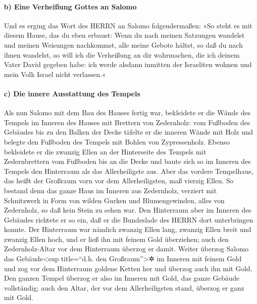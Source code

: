 \hypertarget{b-eine-verheiuxdfung-gottes-an-salomo}{%
\paragraph{b) Eine Verheißung Gottes an
Salomo}\label{b-eine-verheiuxdfung-gottes-an-salomo}}

Und es erging das Wort des HERRN an Salomo
folgendermaßen: »So steht es mit diesem Hause, das du
eben erbaust: Wenn du nach meinen Satzungen wandelst und meinen
Weisungen nachkommst, alle meine Gebote hältst, so daß du nach ihnen
wandelst, so will ich die Verheißung an dir wahrmachen, die ich deinem
Vater David gegeben habe: ich werde alsdann inmitten der
Israeliten wohnen und mein Volk Israel nicht verlassen.«

\hypertarget{c-die-innere-ausstattung-des-tempels}{%
\paragraph{c) Die innere Ausstattung des
Tempels}\label{c-die-innere-ausstattung-des-tempels}}

Als nun Salomo mit dem Bau des Hauses fertig war,
bekleidete er die Wände des Tempels im Inneren des Hauses
mit Brettern von Zedernholz: vom Fußboden des Gebäudes bis zu den Balken
der Decke täfelte er die inneren Wände mit Holz und belegte den Fußboden
des Tempels mit Bohlen von Zypressenholz. Ebenso
bekleidete er die zwanzig Ellen an der Hinterseite des Tempels mit
Zedernbrettern vom Fußboden bis an die Decke und baute sich so im
Inneren des Tempels den Hinterraum als das Allerheiligste aus.
Aber das vordere Tempelhaus, das heißt der Großraum vorn
vor dem Allerheiligsten, maß vierzig Ellen. So bestand
denn das ganze Haus im Inneren aus Zedernholz, verziert mit Schnitzwerk
in Form von wilden Gurken und Blumengewinden, alles von Zedernholz, so
daß kein Stein zu sehen war. Den Hinterraum aber im
Inneren des Gebäudes richtete er so ein, daß er die Bundeslade des HERRN
dort unterbringen konnte. Der Hinterraum war nämlich
zwanzig Ellen lang, zwanzig Ellen breit und zwanzig Ellen hoch, und er
ließ ihn mit feinem Gold überziehen; auch den Zedernholz-Altar vor dem
Hinterraum überzog er damit. Weiter überzog Salomo das
Gebäude\textless sup title=``d.h. den Großraum''\textgreater✲ im Inneren
mit feinem Gold und zog vor dem Hinterraum goldene Ketten her und
überzog auch ihn mit Gold. Den ganzen Tempel überzog er
also im Inneren mit Gold, das ganze Gebäude vollständig; auch den Altar,
der vor dem Allerheiligsten stand, überzog er ganz mit Gold.

